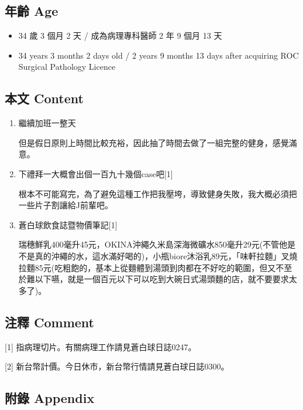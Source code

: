 \documentclass[
]{article}
\providecommand{\tightlist}{%
  \setlength{\itemsep}{0pt}\setlength{\parskip}{0pt}}
\begin{document}
\hypertarget{ux5e74ux9f61-age-22}{%
\subsection{年齡 Age}\label{ux5e74ux9f61-age-22}}

\begin{itemize}
\tightlist
\item
  34 歲 3 個月 2 天 / 成為病理專科醫師 2 年 9 個月 13 天
\item
  34 years 3 months 2 days old / 2 years 9 months 13 days after
  acquiring ROC Surgical Pathology Licence
\end{itemize}

\hypertarget{ux672cux6587-content-22}{%
\subsection{本文 Content}\label{ux672cux6587-content-22}}

\begin{enumerate}
\def\labelenumi{\arabic{enumi}.}
\item
  繼續加班一整天

  但是假日原則上時間比較充裕，因此抽了時間去做了一組完整的健身，感覺滿意。
\item
  下禮拜一大概會出個一百九十幾個case吧{[}1{]}

  根本不可能寫完，為了避免這種工作把我壓垮，導致健身失敗，我大概必須把一些片子割讓給J前輩吧。
\item
  蒼白球飲食誌暨物價筆記{[}1{]}

  瑞穗鮮乳400毫升45元，OKINA沖繩久米島深海微礦水850毫升29元(不管他是不是真的沖繩的水，這水滿好喝的)，小瓶biore沐浴乳89元，「味軒拉麵」叉燒拉麵85元(吃粗飽的，基本上從麵體到湯頭到肉都在不好吃的範圍，但又不至於難以下嚥，就是一個百元以下可以吃到大碗日式湯頭麵的店，就不要要求太多了)。
\end{enumerate}

\hypertarget{ux6ce8ux91cb-comment-22}{%
\subsection{注釋 Comment}\label{ux6ce8ux91cb-comment-22}}

{[}1{]} 指病理切片。有關病理工作請見蒼白球日誌0247。

{[}2{]} 新台幣計價。今日休市，新台幣行情請見蒼白球日誌0300。

\hypertarget{ux9644ux9304-appendix-22}{%
\subsection{附錄 Appendix}\label{ux9644ux9304-appendix-22}}
\end{document}
